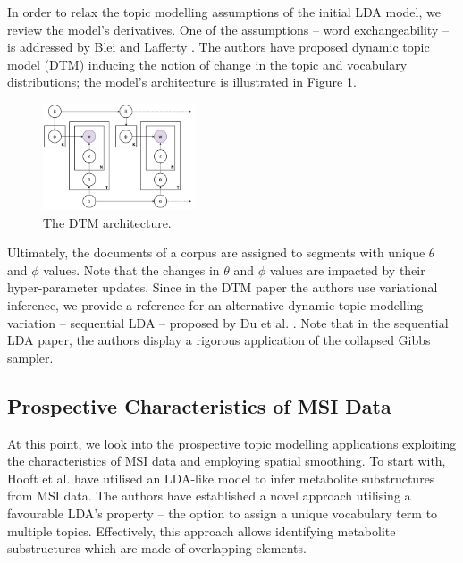 \documentclass{mpaper}
\begin{document}
\par In order to relax the topic modelling assumptions of the initial LDA model, we review the model's derivatives. One of the assumptions -- word exchangeability -- is addressed by Blei and Lafferty \cite{blei2006dynamic}. 
The authors have proposed dynamic topic model (DTM) inducing the notion of change in the topic and vocabulary distributions; the model's architecture is illustrated in Figure \ref{fig:arch_dtm}.
\begin{figure}[h]
  \centering
  \includegraphics[width=0.4\textwidth]{dtm-architecture.png}
  \caption{The DTM architecture.}
  \label{fig:arch_dtm}
\end{figure}
Ultimately, the documents of a corpus are assigned to segments with unique $\theta$ and $\phi$ values. Note that the changes in $\theta$ and $\phi$ values are impacted by their hyper-parameter updates. Since in the DTM paper the authors use variational inference, we provide a reference for an alternative dynamic topic modelling variation -- sequential LDA -- proposed by Du et al. \cite{du2012sequential}. Note that in the sequential LDA paper, the authors display a rigorous application of the collapsed Gibbs sampler. 

\subsection{Prospective Characteristics of MSI Data}
\par At this point, we look into the prospective topic modelling applications exploiting the characteristics of MSI data and employing spatial smoothing. To start with, Hooft et al. \cite{van2016topic} have utilised an LDA-like model to infer metabolite substructures from MSI data. The authors have established a novel approach utilising a favourable LDA's property -- the option to assign a unique vocabulary term to multiple topics. Effectively, this approach allows identifying metabolite substructures which are made of overlapping elements. 
\end{document}
